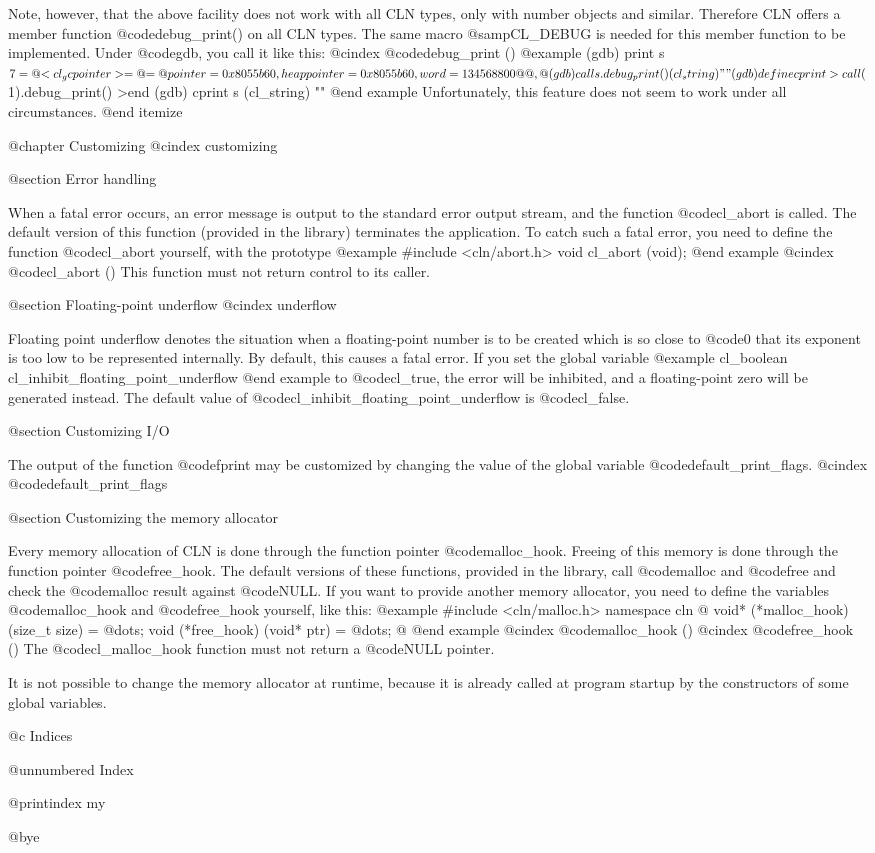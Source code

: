 Note, however, that the above facility does not work with all CLN types,
only with number objects and similar. Therefore CLN offers a member function
@code{debug_print()} on all CLN types. The same macro @samp{CL_DEBUG}
is needed for this member function to be implemented. Under @code{gdb},
you call it like this:
@cindex @code{debug_print ()}
@example
(gdb) print s
$7 = @{<cl_gcpointer> = @{ = @{pointer = 0x8055b60, heappointer = 0x8055b60,
  word = 134568800@}@}, @}
(gdb) call s.debug_print()
(cl_string) ""
(gdb) define cprint
>call ($1).debug_print()
>end
(gdb) cprint s
(cl_string) ""
@end example
Unfortunately, this feature does not seem to work under all circumstances.
@end itemize


@chapter Customizing
@cindex customizing

@section Error handling

When a fatal error occurs, an error message is output to the standard error
output stream, and the function @code{cl_abort} is called. The default
version of this function (provided in the library) terminates the application.
To catch such a fatal error, you need to define the function @code{cl_abort}
yourself, with the prototype
@example
#include <cln/abort.h>
void cl_abort (void);
@end example
@cindex @code{cl_abort ()}
This function must not return control to its caller.


@section Floating-point underflow
@cindex underflow

Floating point underflow denotes the situation when a floating-point number
is to be created which is so close to @code{0} that its exponent is too
low to be represented internally. By default, this causes a fatal error.
If you set the global variable
@example
cl_boolean cl_inhibit_floating_point_underflow
@end example
to @code{cl_true}, the error will be inhibited, and a floating-point zero
will be generated instead.  The default value of 
@code{cl_inhibit_floating_point_underflow} is @code{cl_false}.


@section Customizing I/O

The output of the function @code{fprint} may be customized by changing the
value of the global variable @code{default_print_flags}.
@cindex @code{default_print_flags}


@section Customizing the memory allocator

Every memory allocation of CLN is done through the function pointer
@code{malloc_hook}. Freeing of this memory is done through the function
pointer @code{free_hook}. The default versions of these functions,
provided in the library, call @code{malloc} and @code{free} and check
the @code{malloc} result against @code{NULL}.
If you want to provide another memory allocator, you need to define
the variables @code{malloc_hook} and @code{free_hook} yourself,
like this:
@example
#include <cln/malloc.h>
namespace cln @{
        void* (*malloc_hook) (size_t size) = @dots{};
        void (*free_hook) (void* ptr)      = @dots{};
@}
@end example
@cindex @code{malloc_hook ()}
@cindex @code{free_hook ()}
The @code{cl_malloc_hook} function must not return a @code{NULL} pointer.

It is not possible to change the memory allocator at runtime, because
it is already called at program startup by the constructors of some
global variables.




@c Indices

@unnumbered Index

@printindex my


@bye
